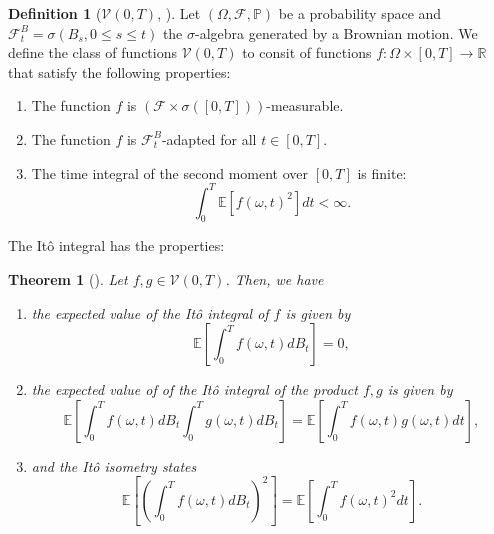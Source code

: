 \documentclass[12pt]{article}
\newtheorem{theorem}{Theorem}[section]
\theoremstyle{definition}
\newtheorem{definition}[definition]{Definition}
\numberwithin{equation}{section}
\newcommand{\R}{\mathbb{R}}
\newcommand{\BP}{\mathbb{P}}
\newcommand{\CF}{\mathcal{F}}
\newcommand{\CV}{\mathcal{V}}
\newcommand{\ev}[1]{\mathbb{E}\left[{#1}\right]}
\begin{document}
\begin{definition}[$\CV(0,T)$, ]
  Let $(\Omega, \CF, \BP)$ be a probability space and $\CF_t^B = \sigma(B_s, 0 \leq s \leq t)$ the $\sigma$-algebra generated by a Brownian motion. We define the class of functions $\CV(0,T)$ to consit of functions $f :\Omega \times [0,T] \rightarrow \R$ that satisfy the following properties:
  \begin{enumerate}[label=(\roman*)]
    \item The function $f$ is $(\CF \times \sigma([0,T]))$-measurable.
    \item The function $f$ is $\CF_t^B$-adapted for all $t \in [0,T]$.
    \item The time integral of the second moment over $[0,T]$ is finite:
    \begin{equation*}
      \int_0^T \ev{f(\omega,t)^2}dt< \infty.
    \end{equation*}
  \end{enumerate}
\end{definition}
The Itô integral has the properties:
\begin{theorem}[\autocite{eAppliedStochasticAnalysis2021}]
  \label{thm:ito_isometry}
  Let $f,g \in \CV(0,T)$. Then, we have
  \begin{enumerate}[label=(\roman*)]
    \item \label{item:zero_integral} the expected value of the Itô integral of $f$ is given by
    \begin{equation}
    \label{eq:ito_integral_ev}
    \ev{\int_0^T f(\omega,t)dB_t} = 0,
    \end{equation}
    \item the expected value of of the Itô integral of the product $f,g$ is given by
    \begin{equation}
      \label{eq:ito_product}
      \ev{\int_0^T f(\omega,t)dB_t\int_0^T g(\omega,t)dB_t } = \ev{\int_0^T f(\omega,t)g(\omega, t)dt },
    \end{equation}
    \item and the Itô isometry states
    \begin{equation}
      \label{eq:ito_isometry}
      \ev{\left(\int_0^T f(\omega,t)dB_t\right)^2 } = \ev{\int_0^T f(\omega,t)^2dt }.
    \end{equation}
  \end{enumerate}
\end{theorem}
\end{document}
